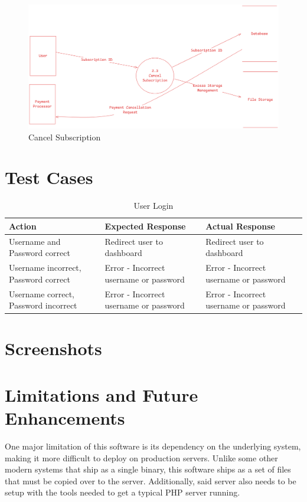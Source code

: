 \documentclass[12pt,a4paper]{report}
\begin{document}
\begin{figure}[H]
	\includegraphics[width=\textwidth]{dfd-L2-cancel_subscription.png}
	\caption{Cancel Subscription}
\end{figure}

\newpage
\chapter{Test Cases}\label{cha:test_cases}
\begin{table}[H]
	\raggedright
	\centering
	\caption{User Login}
	\begin{tabular}{|p{}|p{}|p{}|}
		\hline
		Action                               & Expected Response                      & Actual Response                        \\
		\hline
		Username and Password correct        & Redirect user to dashboard             & Redirect user to dashboard             \\
		\hline
		Username incorrect, Password correct & Error - Incorrect username or password & Error - Incorrect username or password \\
		\hline
		Username correct, Password incorrect & Error - Incorrect username or password & Error - Incorrect username or password \\
		\hline
	\end{tabular}
\end{table}
\newpage
\chapter{Screenshots}\label{cha:screenshots}
\newpage
\chapter{Limitations and Future Enhancements}\label{cha:limitations_and_future_enhancements}
One major limitation of this software is its dependency on the underlying system, making it more difficult to deploy on production servers.
Unlike some other modern systems that ship as a single binary, this software ships as a set of files that must be copied over to the server.
Additionally, said server also needs to be setup with the tools needed to get a typical PHP server running.
\end{document}
